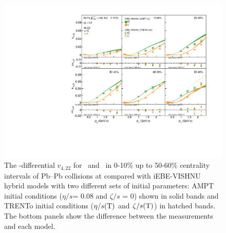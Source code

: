  \begin{figure}[h]
\begin{center}
\includegraphics[scale=0.73]{figures/model/TrentoAndAMPT_v422_gap00_LambdaK0s.pdf}
\end{center}
\caption{The \pT-differential $v_{4,22}$ for \Ks~and \lambdas~in 0-10\% up to 50-60\% centrality intervals of Pb--Pb collisions at \sNN compared with iEBE-VISHNU hybrid models with two different sets of initial parameters: AMPT initial conditions ($\eta/s$= 0.08 and $\zeta/s$ = 0) shown in solid bands and TRENTo initial conditions ($\eta/s({\rm T})$ and $\zeta/s({\rm T})$) in hatched bands. The bottom panels show the difference between the measurements and each model.}
\label{v422_model_KL}
\end{figure}


